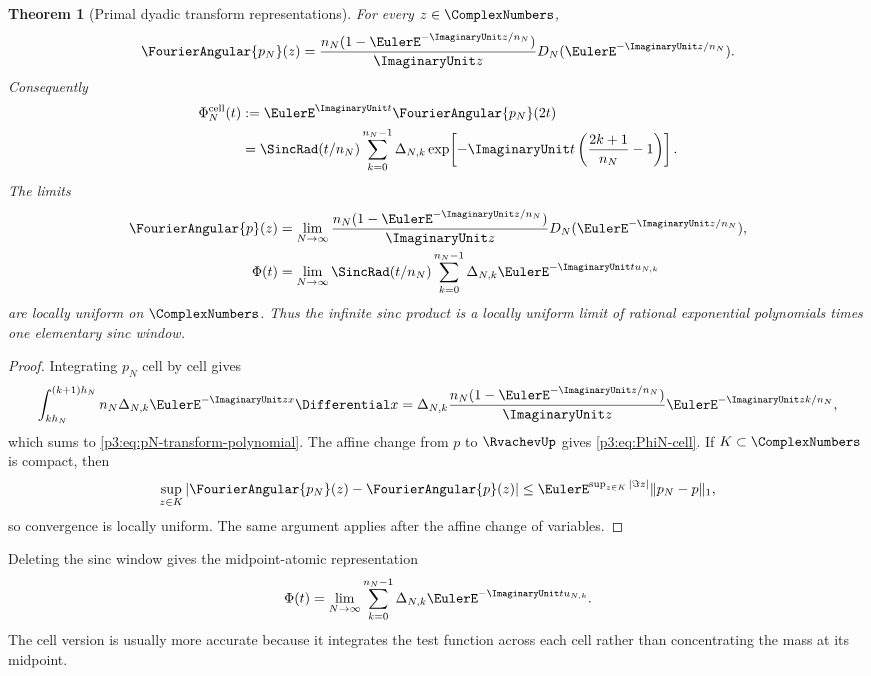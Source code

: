 \documentclass[11pt]{article}
\newtheorem{theorem}{Theorem}[section]
\theoremstyle{definition}
\theoremstyle{remark}
\begin{document}
\begin{theorem}[Primal dyadic transform representations]
\label{p3:thm:primal-transform}
For every $z\in\ComplexNumbers$,
\begin{equation}\label{p3:eq:pN-transform-polynomial}
 \FourierAngular{p_N}(z)
 =\frac{n_N(1-\EulerE^{-\ImaginaryUnit z/n_N})}{\ImaginaryUnit z}
   D_N(\EulerE^{-\ImaginaryUnit z/n_N}).
\end{equation}
Consequently
\begin{align}
 \Phi_N^{\mathrm{cell}}(t)
 &:=\EulerE^{\ImaginaryUnit t}\FourierAngular{p_N}(2t)\label{p3:eq:PhiN-cell-def}\\
 &=\SincRad(t/n_N)
   \sum_{k=0}^{n_N-1}\Delta_{N,k}
   \exp\!\left[-\ImaginaryUnit t\left(\frac{2k+1}{n_N}-1\right)\right].
 \label{p3:eq:PhiN-cell}
\end{align}
The limits
\begin{align}
 \FourierAngular{p}(z)&=\lim_{N\to\infty}
 \frac{n_N(1-\EulerE^{-\ImaginaryUnit z/n_N})}{\ImaginaryUnit z}
 D_N(\EulerE^{-\ImaginaryUnit z/n_N}),\label{p3:eq:p-transform-mass-limit}\\
 \Phi(t)&=\lim_{N\to\infty}\SincRad(t/n_N)
 \sum_{k=0}^{n_N-1}\Delta_{N,k}\EulerE^{-\ImaginaryUnit t u_{N,k}}
 \label{p3:eq:Phi-cell-limit}
\end{align}
are locally uniform on $\ComplexNumbers$.  Thus the infinite sinc product is a locally
uniform limit of rational exponential polynomials times one elementary sinc
window.
\end{theorem}

\begin{proof}
Integrating $p_N$ cell by cell gives
\[
 \int_{kh_N}^{(k+1)h_N}n_N\Delta_{N,k}\EulerE^{-\ImaginaryUnit zx}\Differential x
 =\Delta_{N,k}\frac{n_N(1-\EulerE^{-\ImaginaryUnit z/n_N})}{\ImaginaryUnit z}
  \EulerE^{-\ImaginaryUnit zk/n_N},
\]
which sums to \eqref{p3:eq:pN-transform-polynomial}.  The affine change from $p$
to $\RvachevUp$ gives \eqref{p3:eq:PhiN-cell}.  If $K\subset\ComplexNumbers$ is compact, then
\[
 \sup_{z\in K}|\FourierAngular{p_N}(z)-\FourierAngular{p}(z)|
 \le \EulerE^{\sup_{z\in K}|\Im z|}\|p_N-p\|_1,
\]
so convergence is locally uniform.  The same argument applies after the affine
change of variables.
\end{proof}

Deleting the sinc window gives the midpoint-atomic representation
\begin{equation}\label{p3:eq:Phi-atomic-limit}
 \Phi(t)=\lim_{N\to\infty}
 \sum_{k=0}^{n_N-1}\Delta_{N,k}\EulerE^{-\ImaginaryUnit t u_{N,k}}.
\end{equation}
The cell version is usually more accurate because it integrates the test
function across each cell rather than concentrating the mass at its midpoint.
\end{document}
